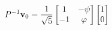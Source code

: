 \documentclass[preview]{standalone}
\begin{document}
\begin{align*}
\special{dvisvgm:raw <g id='unique000'>}P^{-1} \mathbf{v}_0 = \frac{1}{\sqrt{5}}\begin{bmatrix} 1 & -\psi \\ -1 & \varphi \end{bmatrix}\begin{bmatrix} 1 \\ 0 \end{bmatrix}\special{dvisvgm:raw </g>}
\end{align*}
\end{document}
